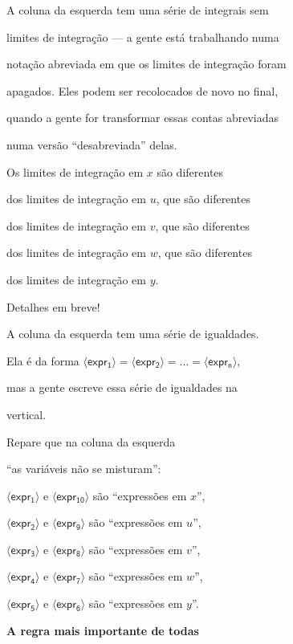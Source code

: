 \documentclass[oneside,12pt]{article}
\begin{document}
A coluna da esquerda tem uma série de integrais sem

limites de integração --- a gente está trabalhando numa

notação abreviada em que os limites de integração foram

apagados. Eles podem ser recolocados de novo no final,

quando a gente for transformar essas contas abreviadas

numa versão ``desabreviada'' delas.

\msk

Os limites de integração em $x$ são diferentes

dos limites de integração em $u$, que são diferentes

dos limites de integração em $v$, que são diferentes

dos limites de integração em $w$, que são diferentes

dos limites de integração em $y$.

\msk

Detalhes em breve!


\newpage


\def\expr#1{〈\mathsf{expr_{#1}}〉}


A coluna da esquerda tem uma série de igualdades.

Ela é da forma $\expr1 = \expr2 = \ldots = \expr{n}$,

mas a gente escreve essa série de igualdades na

vertical.

\msk

Repare que na coluna da esquerda

``as variáveis não se misturam'':

$\expr{1}$ e $\expr{10}$ são ``expressões em $x$'',

$\expr{2}$ e $\expr{9}$ são ``expressões em $u$'',

$\expr{3}$ e $\expr{8}$ são ``expressões em $v$'',

$\expr{4}$ e $\expr{7}$ são ``expressões em $w$'',

$\expr{5}$ e $\expr{6}$ são ``expressões em $y$''.


\newpage


{\bf A regra mais importante de todas}
\end{document}
